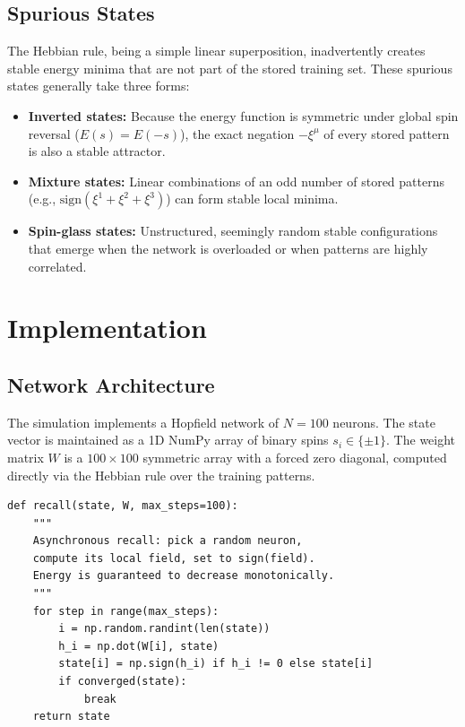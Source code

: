 \documentclass[11pt,a4paper,twocolumn]{article}
\begin{document}
\subsection{Spurious States}
\label{sec:spurious_theory}

The Hebbian rule, being a simple linear superposition, inadvertently creates
stable energy minima that are not part of the stored training set. These
spurious states generally take three forms:
\begin{itemize}
    \item \textbf{Inverted states:} Because the energy function is symmetric
    under global spin reversal ($E(s) = E(-s)$), the exact negation
    $-\xi^\mu$ of every stored pattern is also a stable attractor.
    \item \textbf{Mixture states:} Linear combinations of an odd number of
    stored patterns (e.g.,
    $\text{sign}(\xi^1 + \xi^2 + \xi^3)$) can form stable local minima.
    \item \textbf{Spin-glass states:} Unstructured, seemingly random stable
    configurations that emerge when the network is overloaded or when patterns
    are highly correlated.
\end{itemize}

\section{Implementation}
\label{sec:implementation}

\subsection{Network Architecture}
\label{sec:architecture}

The simulation implements a Hopfield network of $N=100$ neurons. The state
vector is maintained as a 1D NumPy array of binary spins
$s_i \in \{\pm 1\}$. The weight matrix $W$ is a $100 \times 100$ symmetric
array with a forced zero diagonal, computed directly via the Hebbian rule over
the training patterns.

\begin{lstlisting}[caption={Hopfield Recall --- Asynchronous Update},
                   label={lst:recall}]
def recall(state, W, max_steps=100):
    """
    Asynchronous recall: pick a random neuron,
    compute its local field, set to sign(field).
    Energy is guaranteed to decrease monotonically.
    """
    for step in range(max_steps):
        i = np.random.randint(len(state))
        h_i = np.dot(W[i], state)
        state[i] = np.sign(h_i) if h_i != 0 else state[i]
        if converged(state):
            break
    return state
\end{lstlisting}
\end{document}
